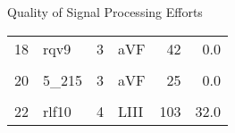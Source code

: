 \documentclass[
  ignorenonframetext,
  unknownkeysallowed]{beamer}
\begin{document}
\begin{frame}{Quality of Signal Processing Efforts}
\begin{table}
\begin{tabular}[t]{rlrlrr}
18 & rqv9 & 3 & aVF & 42 & 0.0\\
\cellcolor{gray!6}{19} & \cellcolor{gray!6}{rqv9} & \cellcolor{gray!6}{4} & \cellcolor{gray!6}{aVF} & \cellcolor{gray!6}{75} & \cellcolor{gray!6}{0.0}\\
20 & 5\_215 & 3 & aVF & 25 & 0.0\\
\addlinespace
\cellcolor{gray!6}{21} & \cellcolor{gray!6}{5\_215} & \cellcolor{gray!6}{4} & \cellcolor{gray!6}{Vx} & \cellcolor{gray!6}{54} & \cellcolor{gray!6}{0.0}\\
22 & rlf10 & 4 & LIII & 103 & 32.0\\
\bottomrule
\end{tabular}
\end{table}

\end{frame}
\end{document}
